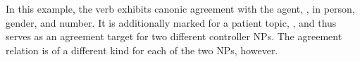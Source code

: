 In this example, the verb exhibits canonic agreement with the agent, 
, in person, gender, and number. It is additionally marked 
for a patient topic, , and thus serves as an agreement target 
for two different controller NPs. The agreement relation is of a different kind
for each of the two NPs, however.

